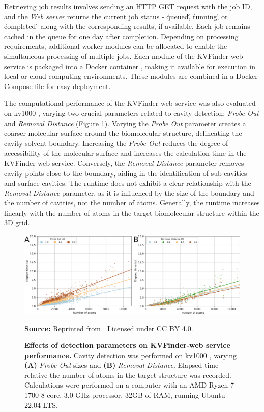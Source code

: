 \documentclass[Ingles]{phdthesis}
\begin{document}
Retrieving job results involves sending an HTTP GET request with the job ID, and the \textit{Web server} returns the current job status - \'queued\', \'running\', or \'completed\' - along with the corresponding results, if available. Each job remains cached in the queue for one day after completion. Depending on processing requirements, additional worker modules can be allocated to enable the simultaneous processing of multiple jobs. Each module of the KVFinder-web service is packaged into a Docker container \cite{docker}, making it available for execution in local or cloud computing environments. These modules are combined in a Docker Compose file for easy deployment.

The computational performance of the KVFinder-web service was also evaluated on kv1000 \cite{guerra2020}, varying two crucial parameters related to cavity detection: \textit{Probe Out} and \textit{Removal Distance} (Figure \ref{fig:kvweb-performance}). Varying the \textit{Probe Out} parameter creates a coarser molecular surface around the biomolecular structure, delineating the cavity-solvent boundary. Increasing the \textit{Probe Out} reduces the degree of accessibility of the molecular surface and increases the calculation time in the KVFinder-web service. Conversely, the \textit{Removal Distance} parameter removes cavity points close to the boundary, aiding in the identification of sub-cavities and surface cavities. The runtime does not exhibit a clear relationship with the \textit{Removal Distance} parameter, as it is influenced by the size of the boundary and the number of cavities, not the number of atoms. Generally, the runtime increases linearly with the number of atoms in the target biomolecular structure within the 3D grid.

\begin{figure}[h]
  \centering
  \includegraphics[scale=1.6]{images/kvweb-performance.png}
  \centerline{\tiny{\textbf{Source:} Reprinted from \cite{guerra2023A}. Licensed under \href{https://creativecommons.org/licenses/by/4.0/}{CC BY 4.0}.}}
  \caption[Effects of detection parameters on KVFinder-web service performance]{\textbf{Effects of detection parameters on KVFinder-web service performance.} Cavity detection was performed on kv1000 \cite{guerra2020}, varying \textbf{(A)} \textit{Probe Out} sizes and \textbf{(B)} \textit{Removal Distance}. Elapsed time relative the number of atoms in the target structure was recorded. Calculations were performed on a computer with an AMD Ryzen 7 1700 8-core, 3.0 GHz processor, 32GB of RAM, running Ubuntu 22.04 LTS.}
  \label{fig:kvweb-performance}
\end{figure}
\end{document}
